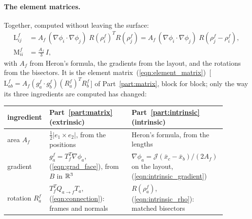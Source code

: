 \paragraph{The element matrices.} Together, computed without leaving the surface:
\begin{equation}
\label{eqn:intrinsic_element}
\begin{aligned}
\mathrm L^f_{ij} &= A_f\, (\nabla\phi_i \cdot \nabla\phi_j)\; R(\rho_i^f)^TR(\rho_j^f) = A_f\, (\nabla\phi_i \cdot \nabla\phi_j)\; R(\rho_j^f - \rho_i^f), \\
\mathrm M^f_{ii} &= \frac{A_f}{3}\,I ,
\end{aligned}
\end{equation}
with $A_f$ from Heron's formula, the gradients from the layout, and the rotations from the bisectors. It is the element matrix~(\ref{eqn:element_matrix})~[\,$\mathrm L^f_{ab} = A_f(g_a^f\cdot g_b^f)(R_a^f)^TR_b^f$\,] of Part~\ref{part:matrix}, block for block; only the way its three ingredients are computed has changed:
\begin{center}
\footnotesize
\begin{tabular}{p{0.15\linewidth} p{0.37\linewidth} p{0.37\linewidth}}
\toprule
ingredient & Part~\ref{part:matrix} (extrinsic) & Part~\ref{part:intrinsic} (intrinsic) \\
\midrule
area $A_f$ & $\frac12|e_1\times e_2|$, from the positions & Heron's formula, from the lengths \\
gradient & $g_a^f = T_f^T\nabla\phi_a$, (\ref{eqn:grad_face}), from $B$ in $\mathbb{R}^3$ & $\nabla\phi_a = \mathcal J(\bar x_c - \bar x_b)/(2A_f)$ on the layout, (\ref{eqn:intrinsic_gradient}) \\
rotation $R_a^f$ & $T_f^TQ_{a\to f}T_a$, (\ref{eqn:connection}): frames and normals & $R(\rho_a^f)$, (\ref{eqn:intrinsic_rho}): matched bisectors \\
\bottomrule
\end{tabular}
\end{center}

